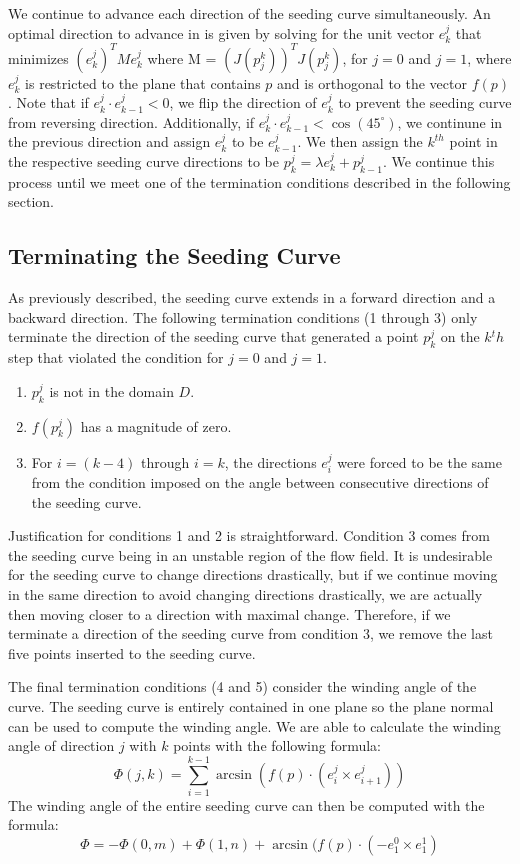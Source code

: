 \documentclass{vgtc}                          %
\begin{document}
We continue to advance each direction of the seeding curve simultaneously.
An optimal direction to advance in is given by solving for the unit vector $e_k^j$ that minimizes $(e_k^j)^TM e_k^j$ where M = $(J(p_j^k))^TJ(p_j^k)$, for $j = 0$ and $j = 1$, where $e_k^j$ is restricted to the plane that contains $p$ and is orthogonal to the vector $f(p)$.
Note that if $e_k^j \cdot e_{k - 1}^j < 0$, we flip the direction of $e_k^j$ to prevent the seeding curve from reversing direction.
Additionally, if $e_k^j \cdot e_{k - 1}^j < \cos(45^\circ)$, we continune in the previous direction and assign $e_k^j$ to be  $e_{k - 1}^j$.
We then assign the $k^{th}$ point in the respective seeding curve directions to be $p_k^j = \lambda e_k^j + p_{k - 1}^j$.
We continue this process until we meet one of the termination conditions described in the following section.

\subsection{Terminating the Seeding Curve }

As previously described, the seeding curve extends in a forward direction and a backward direction.
The following termination conditions (1 through 3) only terminate the direction of the seeding curve that generated a point $p_k^j$ on the $k{^th}$ step that violated the condition for $j = 0$ and $j = 1$.
\begin{enumerate}
\item{$p_k^j$ is not in the domain $D$.}
\item{$f(p_k^j)$ has a magnitude of zero.}
\item{For $i = (k-4)$ through $i = k$, the directions $e_i^j$ were forced to be the same from the condition imposed on the angle between consecutive directions of the seeding curve.}
\end{enumerate}

Justification for conditions 1 and 2 is straightforward.
Condition 3 comes from the seeding curve being in an unstable region of the flow field.
It is undesirable for the seeding curve to change directions drastically, but if we continue moving in the same direction to avoid changing directions drastically, we are actually then moving closer to a direction with maximal change.
Therefore, if we terminate a direction of the seeding curve from condition 3, we remove the last five points inserted to the seeding curve.

The final termination conditions (4 and 5) consider the winding angle of the curve.
The seeding curve is entirely contained in one plane so the plane normal can be used to compute the winding angle.
We are able to calculate the winding angle of direction $j$ with $k$ points with the following formula:
\begin{displaymath}
\Phi(j, k) = \sum_{i = 1}^{k - 1} \arcsin(f(p)\cdot(e_i^j \times e_{i + 1}^j))
\end{displaymath}
The winding angle of the entire seeding curve can then be computed with the formula:
\begin{displaymath}
\Phi = -\Phi(0, m) + \Phi(1, n) + \arcsin(f(p)\cdot(-e_1^0 \times e_1^1)
\end{displaymath}
\end{document}
